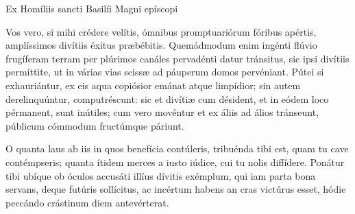 {

\noindent Ex Homíliis sancti Basilíi Magni epíscopi


\noindent Vos vero, si mihi crédere velítis, ómnibus promptuariórum fóribus apértis, amplíssimos divítiis éxitus præbébitis. Quemádmodum enim ingénti flúvio frugíferam terram per plúrimos canáles pervadénti datur tránsitus, sic ipsi divítiis permíttite, ut in várias vias scissæ ad páuperum domos pervéniant. Pútei si exhauriántur, ex eis aqua copiósior emánat atque limpídior; sin autem derelinquúntur, computréscunt: sic et divítiæ cum désident, et in eódem loco pérmanent, sunt inútiles; cum vero movéntur et ex áliis ad álios tránseunt, públicum cómmodum fructúmque páriunt.

\noindent O quanta laus ab iis in quos benefícia contúleris, tribuénda tibi est, quam tu cave contémpseris; quanta ítidem merces a iusto iúdice, cui tu nolis diffídere. Ponátur tibi ubíque ob óculos accusáti illíus dívitis exémplum, qui iam parta bona servans, deque futúris sollícitus, ac incértum habens an cras victúrus esset, hódie peccándo crástinum diem antevérterat.

\vfill
\pagebreak

 

\vspace{-5mm}


\vfill
\pagebreak
}
